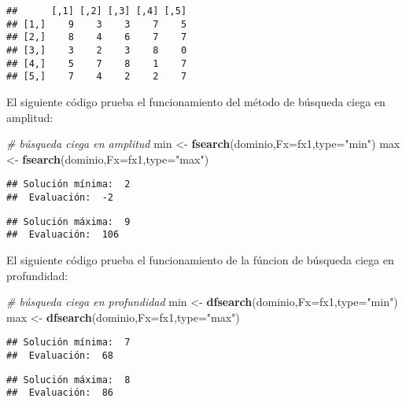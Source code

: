 \documentclass[11pt,]{article}
\newenvironment{Shaded}{\begin{snugshade}}{\end{snugshade}}
\newcommand{\CommentTok}[1]{\textcolor[rgb]{0.56,0.35,0.01}{\textit{#1}}}
\newcommand{\DataTypeTok}[1]{\textcolor[rgb]{0.13,0.29,0.53}{#1}}
\newcommand{\KeywordTok}[1]{\textcolor[rgb]{0.13,0.29,0.53}{\textbf{#1}}}
\newcommand{\NormalTok}[1]{#1}
\newcommand{\StringTok}[1]{\textcolor[rgb]{0.31,0.60,0.02}{#1}}
\begin{document}
\begin{verbatim}
##      [,1] [,2] [,3] [,4] [,5]
## [1,]    9    3    3    7    5
## [2,]    8    4    6    7    7
## [3,]    3    2    3    8    0
## [4,]    5    7    8    1    7
## [5,]    7    4    2    2    7
\end{verbatim}

El siguiente código prueba el funcionamiento del método de búsqueda
ciega en amplitud:

\begin{Shaded}
\begin{Highlighting}[]
\CommentTok{# búsqueda ciega en amplitud}
\NormalTok{min <-}\StringTok{ }\KeywordTok{fsearch}\NormalTok{(dominio,}\DataTypeTok{Fx=}\NormalTok{fx1,}\DataTypeTok{type=}\StringTok{"min"}\NormalTok{)}
\NormalTok{max <-}\StringTok{ }\KeywordTok{fsearch}\NormalTok{(dominio,}\DataTypeTok{Fx=}\NormalTok{fx1,}\DataTypeTok{type=}\StringTok{"max"}\NormalTok{)}
\end{Highlighting}
\end{Shaded}

\begin{verbatim}
## Solución mínima:  2 
##  Evaluación:  -2
\end{verbatim}

\begin{verbatim}
## Solución máxima:  9 
##  Evaluación:  106
\end{verbatim}

El siguiente código prueba el funcionamiento de la fúncion de búsqueda
ciega en profundidad:

\begin{Shaded}
\begin{Highlighting}[]
\CommentTok{# búsqueda ciega en profundidad}
\NormalTok{min <-}\StringTok{ }\KeywordTok{dfsearch}\NormalTok{(dominio,}\DataTypeTok{Fx=}\NormalTok{fx1,}\DataTypeTok{type=}\StringTok{"min"}\NormalTok{)}
\NormalTok{max <-}\StringTok{ }\KeywordTok{dfsearch}\NormalTok{(dominio,}\DataTypeTok{Fx=}\NormalTok{fx1,}\DataTypeTok{type=}\StringTok{"max"}\NormalTok{)}
\end{Highlighting}
\end{Shaded}

\begin{verbatim}
## Solución mínima:  7 
##  Evaluación:  68
\end{verbatim}

\begin{verbatim}
## Solución máxima:  8 
##  Evaluación:  86
\end{verbatim}

\newpage
\singlespacing 
\end{document}
